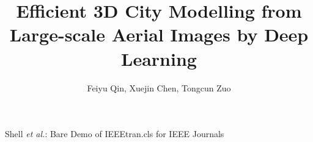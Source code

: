 \documentclass[journal]{IEEEtran}
\begin{document}
\title{Efficient 3D City Modelling from Large-scale Aerial Images by Deep Learning}
%
%
%

\author{Feiyu Qin,
        Xuejin Chen,
       Tongcun Zuo}%

%
{Shell \MakeLowercase{\textit{et al.}}: Bare Demo of IEEEtran.cls for IEEE Journals}
\maketitle










\end{document}
